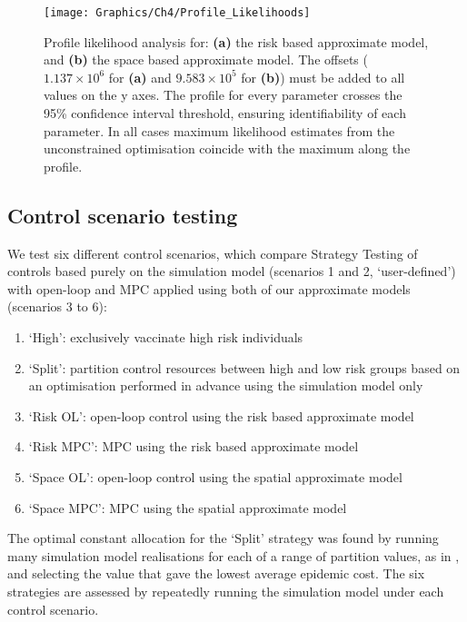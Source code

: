 \begin{figure}
    \begin{center}
        \texttt{[image: Graphics/Ch4/Profile\_Likelihoods]}
        \caption[Profile likelihood analysis for the approximate models]{Profile likelihood analysis for: \textbf{(a)} the risk based approximate model, and \textbf{(b)} the space based approximate model. The offsets ($1.137\times10^6$ for \textbf{(a)} and $9.583\times10^5$ for \textbf{(b)}) must be added to all values on the y axes. The profile for every parameter crosses the 95\% confidence interval threshold, ensuring identifiability of each parameter. In all cases maximum likelihood estimates from the unconstrained optimisation coincide with the maximum along the profile.}
        \label{fig:profile_lik}
    \end{center}
\end{figure}

\FloatBarrier
\subsection{Control scenario testing}

We test six different control scenarios, which compare Strategy Testing of controls based purely on the simulation model (scenarios 1 and 2, `user-defined') with open-loop and MPC applied using both of our approximate models (scenarios 3 to 6):
\begin{enumerate}
    \setlength{\itemsep}{3pt}%
    \setlength{\parskip}{3pt}%
    \setlength{\parsep}{3pt}%
    \item{}`High': exclusively vaccinate high risk individuals
    \item{}`Split': partition control resources between high and low risk groups based on an optimisation performed in advance using the simulation model only
    \item{}`Risk OL': open-loop control using the risk based approximate model
    \item{}`Risk MPC': MPC using the risk based approximate model
    \item{}`Space OL': open-loop control using the spatial approximate model
    \item{}`Space MPC': MPC using the spatial approximate model
\end{enumerate}

The optimal constant allocation for the `Split' strategy was found by running many simulation model realisations for each of a range of partition values, as in \citet{cunniffe_optimising_2015}, and selecting the value that gave the lowest average epidemic cost. The six strategies are assessed by repeatedly running the simulation model under each control scenario.

